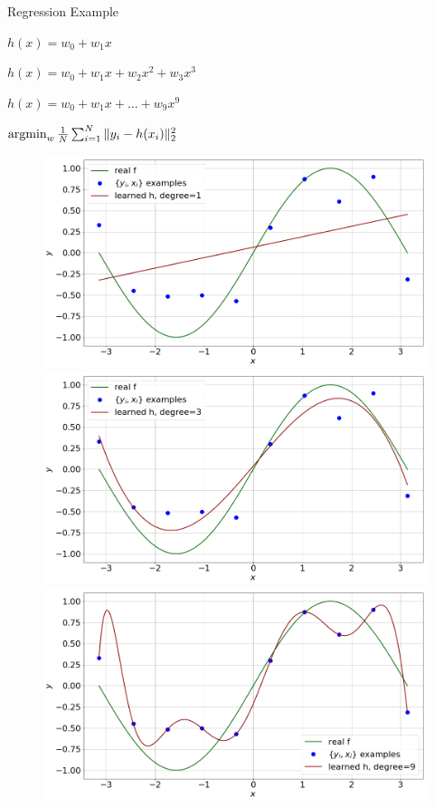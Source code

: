 \documentclass[lualatex, aspectratio=169]{beamer}
\begin{document}
\begin{frame}{Regression Example}

  \begin{description}
    \item<1>[Model] $h(x) = w_0 + w_1 x$
    \item<2>[Model] $h(x) = w_0 + w_1 x + w_2 x^2 + w_3 x^3$
    \item<3>[Model] $h(x) = w_0 + w_1 x + \ldots + w_9 x^9$
    \item[Objective] $\argmin_{w} \frac{1}{N} \sum^N_{i=1} \|y_i - h(x_i)\|^2_2$ 
  \end{description}

  \begin{figure}
    \begin{overprint}%
      \centerline{\includegraphics[width=0.5\pagewidth]{assets/poly1.png}}
      \centerline{\includegraphics[width=0.5\pagewidth]{assets/poly3.png}}
      \centerline{\includegraphics[width=0.5\pagewidth]{assets/poly9.png}}
    \end{overprint}
  \end{figure}


\end{frame}
\end{document}
